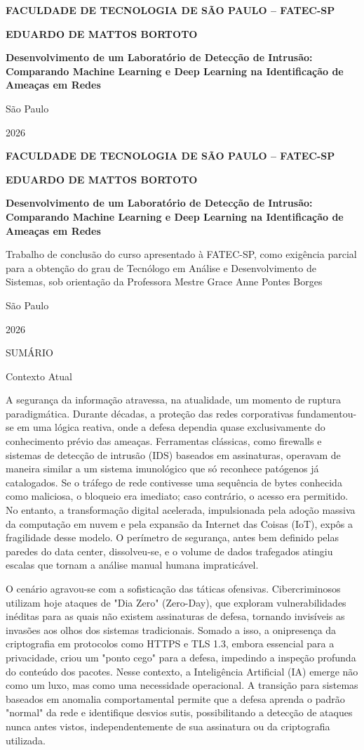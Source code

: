 \documentclass[]{article}
\begin{document}
\textbf{FACULDADE DE TECNOLOGIA DE SÃO PAULO -- FATEC-SP}

\textbf{EDUARDO DE MATTOS BORTOTO}

\textbf{Desenvolvimento de um Laboratório de Detecção de Intrusão:
Comparando Machine Learning e Deep Learning na Identificação de Ameaças
em Redes}

São Paulo

2026

\textbf{FACULDADE DE TECNOLOGIA DE SÃO PAULO -- FATEC-SP}

\textbf{EDUARDO DE MATTOS BORTOTO}

\textbf{Desenvolvimento de um Laboratório de Detecção de Intrusão:
Comparando Machine Learning e Deep Learning na Identificação de Ameaças
em Redes}

Trabalho de conclusão do curso apresentado à FATEC-SP, como exigência
parcial para a obtenção do grau de Tecnólogo em Análise e
Desenvolvimento de Sistemas, sob orientação da Professora Mestre Grace
Anne Pontes Borges

São Paulo

2026

SUMÁRIO

Contexto Atual

A segurança da informação atravessa, na atualidade, um momento de
ruptura paradigmática. Durante décadas, a proteção das redes
corporativas fundamentou-se em uma lógica reativa, onde a defesa
dependia quase exclusivamente do conhecimento prévio das ameaças.
Ferramentas clássicas, como firewalls e sistemas de detecção de intrusão
(IDS) baseados em assinaturas, operavam de maneira similar a um sistema
imunológico que só reconhece patógenos já catalogados. Se o tráfego de
rede contivesse uma sequência de bytes conhecida como maliciosa, o
bloqueio era imediato; caso contrário, o acesso era permitido. No
entanto, a transformação digital acelerada, impulsionada pela adoção
massiva da computação em nuvem e pela expansão da Internet das Coisas
(IoT), expôs a fragilidade desse modelo. O perímetro de segurança, antes
bem definido pelas paredes do data center, dissolveu-se, e o volume de
dados trafegados atingiu escalas que tornam a análise manual humana
impraticável.

O cenário agravou-se com a sofisticação das táticas ofensivas.
Cibercriminosos utilizam hoje ataques de "Dia Zero" (Zero-Day), que
exploram vulnerabilidades inéditas para as quais não existem assinaturas
de defesa, tornando invisíveis as invasões aos olhos dos sistemas
tradicionais. Somado a isso, a onipresença da criptografia em protocolos
como HTTPS e TLS 1.3, embora essencial para a privacidade, criou um
"ponto cego" para a defesa, impedindo a inspeção profunda do conteúdo
dos pacotes. Nesse contexto, a Inteligência Artificial (IA) emerge não
como um luxo, mas como uma necessidade operacional. A transição para
sistemas baseados em anomalia comportamental permite que a defesa
aprenda o padrão "normal" da rede e identifique desvios sutis,
possibilitando a detecção de ataques nunca antes vistos,
independentemente de sua assinatura ou da criptografia utilizada.
\end{document}
